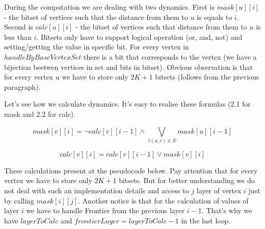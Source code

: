 During the computation we are dealing with two dynamics. First is $mask[u][i]$ - the bitset of vertices such that the distance from them to $u$ is equals to $i$. Second is $calc[u][i]$ - the bitset of vertices such that distance from them to $u$ is less than $i$. Bitsets only have to support logical operation (or, and, not) and setting/getting the value in specific bit. For every vertex in $handleByBaseVertexSet$ there is a  bit that corresponds to the vertex (we have a bijection beetwen vertices in set and bits in bitset).  Obvious observation is that for every vertex $u$ we have to store only $2K+1$ bitsets (follows from the previous paragraph). 
 
 Let's see how we calculate dynamics. It's easy to realise these formulas (2.1 for mask and 2.2 for calc).

\FloatBarrier
\begin{equation}
mask[v][i] = \neg calc[v][i - 1] \wedge \bigvee_{\exists (u, v) \in E} mask[u][i - 1] 
\end{equation}
\FloatBarrier

\FloatBarrier
\begin{equation}
calc[v][i] = calc[v][i - 1] \vee mask[v][i]
\end{equation}
\FloatBarrier

These calculations present at the pseudocode below. Pay attention that for every vertex we have to store only $2K + 1$ bitsets. But for better understanding we do not deal with such an implementation details and access to $j$ layer of vertex $i$ just by calling $mask[i][j]$. Another notice is that for the calculation of values of layer $i$ we have to handle Frontier from the previous layer $i-1$. That's why we have $layerToCalc$ and $frontierLayer = layerToCalc - 1$ in the last loop.


